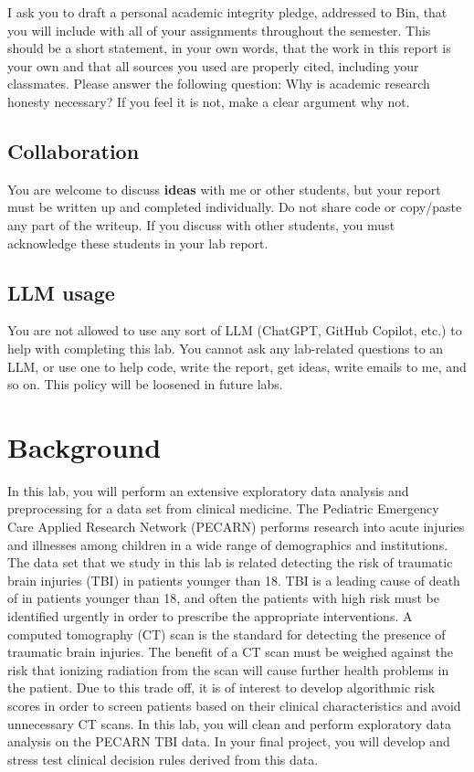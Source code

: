 \documentclass[10pt,letterpaper]{article}
\begin{document}
I ask you to draft a personal academic integrity pledge, addressed to Bin, that you will include with all of your assignments throughout the semester. This should be a short statement, in your own words, that the work in this report is your own and that all sources you used are properly cited, including your classmates. Please answer the following question: Why is academic research honesty necessary? If you feel it is not, make a clear argument why not.

\subsection*{Collaboration}

You are welcome to discuss \textbf{ideas} with me or other students, but your report must be written up and completed individually. Do not share code or copy/paste any part of the writeup. If you discuss with other students, you must acknowledge these students in your lab report.

\subsection*{LLM usage}

You are not allowed to use any sort of LLM (ChatGPT, GitHub Copilot, etc.) to help with completing this lab. You cannot ask any lab-related questions to an LLM, or use one to help code, write the report, get ideas, write emails to me, and so on. This policy will be loosened in future labs.

\section*{Background}

In this lab, you will perform an extensive exploratory data analysis and preprocessing for a data set from clinical medicine. The Pediatric Emergency Care Applied Research Network (PECARN) performs research into acute injuries and illnesses among children in a wide range of demographics and institutions. The data set that we study in this lab is related detecting the risk of traumatic brain injuries (TBI) in patients younger than 18. TBI is a leading cause of death of in patients younger than 18, and often the patients with high risk must be identified urgently in order to prescribe the appropriate interventions. A computed tomography (CT) scan is the standard for detecting the presence of traumatic brain injuries. The benefit of a CT scan must be weighed against the risk that ionizing radiation from the scan will cause further health problems in the patient. Due to this trade off, it is of interest to develop algorithmic risk scores in order to screen patients based on their clinical characteristics and avoid unnecessary CT scans. In this lab, you will clean and perform exploratory data analysis on the PECARN TBI data. In your final project, you will develop and stress test clinical decision rules derived from this data.
\end{document}

